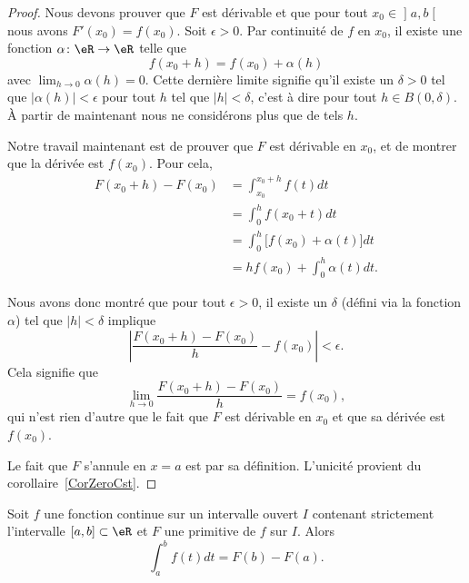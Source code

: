 \begin{proof}
Nous devons prouver que \( F\) est dérivable et que pour tout \( x_0\in\mathopen] a , b \mathclose[\) nous avons \( F'(x_0)=f(x_0)\). Soit \( \epsilon>0\). Par continuité de \( f\) en \( x_0\), il existe une fonction \( \alpha\colon \eR\to \eR\) telle que
    \begin{equation}
        f(x_0+h)=f(x_0)+\alpha(h)
    \end{equation}
    avec \( \lim_{h\to 0} \alpha(h)=0\). Cette dernière limite signifie qu'il existe un \( \delta>0\) tel que \( |\alpha(h)|<\epsilon\) pour tout \( h\) tel que \( | h |<\delta\), c'est à dire pour tout \( h\in B(0,\delta)\). À partir de maintenant nous ne considérons plus que de tels \( h\).

    Notre travail maintenant est de prouver que \( F\) est dérivable en \( x_0\), et de montrer que la dérivée est \( f(x_0)\). Pour cela,
    \begin{subequations}
        \begin{align}
            F(x_0+h)-F(x_0)&=\int_{x_0}^{x_0+h}f(t)dt\\
        &=\int_0^hf(x_0+t)dt\\
        &=\int_0^h\big[ f(x_0)+\alpha(t) \big]dt\\
        &=hf(x_0)+\int_0^{h}\alpha(t)dt.
        \end{align}
    \end{subequations}

    Nous avons donc montré que pour tout \( \epsilon>0\), il existe un \( \delta\) (défini via la fonction \( \alpha\)) tel que \( | h |<\delta\) implique
    \begin{equation}
        \left| \frac{ F(x_0+h)-F(x_0) }{ h }-f(x_0) \right| <\epsilon.
    \end{equation}
    Cela signifie que 
    \begin{equation}
        \lim_{h\to 0} \frac{ F(x_0+h)-F(x_0) }{ h }=f(x_0),
    \end{equation}
    qui n'est rien d'autre que le fait que \( F\) est dérivable en \( x_0\) et que sa dérivée est \( f(x_0)\).

    Le fait que \( F\) s'annule en \( x=a\) est par sa définition. L'unicité provient du corollaire~\ref{CorZeroCst}.
\end{proof}

\begin{theorem}    \label{ThoRWXooTqHGbC}
    Soit \( f\) une fonction continue sur un intervalle ouvert \( I\) contenant strictement l'intervalle \( \mathopen[ a , b \mathclose]\subset \eR\) et \( F\) une primitive de \( f\) sur \( I\). Alors
    \begin{equation}
        \int_a^bf(t)dt=F(b)-F(a).
    \end{equation}
\end{theorem}

